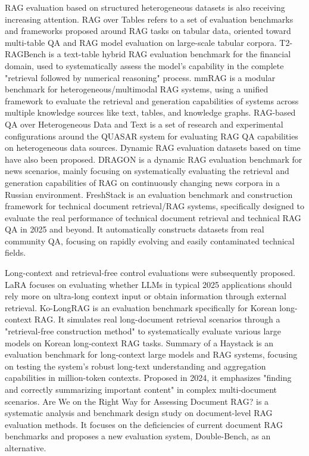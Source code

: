 RAG evaluation based on structured heterogeneous datasets is also receiving increasing attention. RAG over Tables \cite{ragovertables2025} refers to a set of evaluation benchmarks and frameworks proposed around RAG tasks on tabular data, oriented toward multi-table QA and RAG model evaluation on large-scale tabular corpora. T2-RAGBench \cite{t2ragbench2025} is a text-table hybrid RAG evaluation benchmark for the financial domain, used to systematically assess the model's capability in the complete "retrieval followed by numerical reasoning" process. mmRAG \cite{mmrag2025} is a modular benchmark for heterogeneous/multimodal RAG systems, using a unified framework to evaluate the retrieval and generation capabilities of systems across multiple knowledge sources like text, tables, and knowledge graphs. RAG-based QA over Heterogeneous Data and Text \cite{raghetero2024} is a set of research and experimental configurations around the QUASAR system for evaluating RAG QA capabilities on heterogeneous data sources. Dynamic RAG evaluation datasets based on time have also been proposed. DRAGON \cite{dragon2024} is a dynamic RAG evaluation benchmark for news scenarios, mainly focusing on systematically evaluating the retrieval and generation capabilities of RAG on continuously changing news corpora in a Russian environment. FreshStack \cite{freshstack2025} is an evaluation benchmark and construction framework for technical document retrieval/RAG systems, specifically designed to evaluate the real performance of technical document retrieval and technical RAG QA in 2025 and beyond. It automatically constructs datasets from real community QA, focusing on rapidly evolving and easily contaminated technical fields.

Long-context and retrieval-free control evaluations were subsequently proposed. LaRA \cite{lara2025} focuses on evaluating whether LLMs in typical 2025 applications should rely more on ultra-long context input or obtain information through external retrieval. Ko-LongRAG \cite{kolongrag2025} is an evaluation benchmark specifically for Korean long-context RAG. It simulates real long-document retrieval scenarios through a "retrieval-free construction method" to systematically evaluate various large models on Korean long-context RAG tasks. Summary of a Haystack \cite{summaryhaystack2024} is an evaluation benchmark for long-context large models and RAG systems, focusing on testing the system's robust long-text understanding and aggregation capabilities in million-token contexts. Proposed in 2024, it emphasizes "finding and correctly summarizing important content" in complex multi-document scenarios. Are We on the Right Way for Assessing Document RAG? \cite{rightwaydocumentrag2025} is a systematic analysis and benchmark design study on document-level RAG evaluation methods. It focuses on the deficiencies of current document RAG benchmarks and proposes a new evaluation system, Double-Bench, as an alternative.

